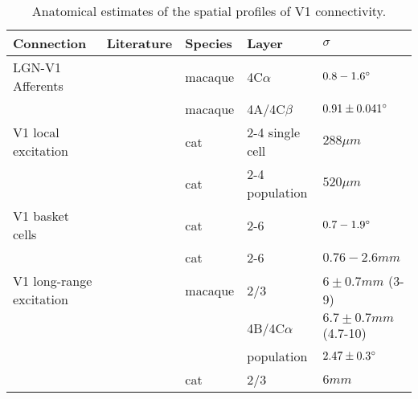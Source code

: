 \begin{table}
  \centering
  \begin{adjustbox}{width=1\textwidth}
  \begin{tabular}{l | l l l l}
    Connection               & Literature            & Species & Layer & $\sigma$ \\
    \hline
    LGN-V1 Afferents         & \cite{Angelucci2002c} & macaque & 4C$\alpha$ & $0.8-1.6\degree$ \\
                             & \cite{Angelucci2006a} & macaque & 4A/4C$\beta$ & $0.91 \pm 0.041 \degree$ \\
    \hline
    V1 local excitation      & \cite{Buzas2006}      & cat      & 2-4 single cell & $288 \mu m$ \\
                             & \cite{Buzas2006}      & cat      & 2-4 population  & $520 \mu m$ \\
    \hline
    V1 basket cells          & \cite{Buzas2001}      & cat      & 2-6 & $0.7-1.9 \degree$ \\
                             & \cite{Buzas2001}      & cat      & 2-6 & $0.76-2.6 mm$ \\
    \hline
    V1 long-range excitation & \cite{Angelucci2002}  & macaque  & 2/3 & $6\pm 0.7 mm$ (3-9) \\
                             &                       &          & 4B/4C$\alpha$ & $6.7 \pm 0.7 mm$ (4.7-10) \\
                             &                       &          & population & $2.47 \pm 0.3 \degree$ \\
                             & \cite{Buzas2006}      & cat      & 2/3 & $6 mm$ \\
    \hline
  \end{tabular}
  \end{adjustbox}
  \caption[]%
          {Anatomical estimates of the spatial profiles of V1 connectivity.}
  \label{anatomicaltable}
\end{table}


